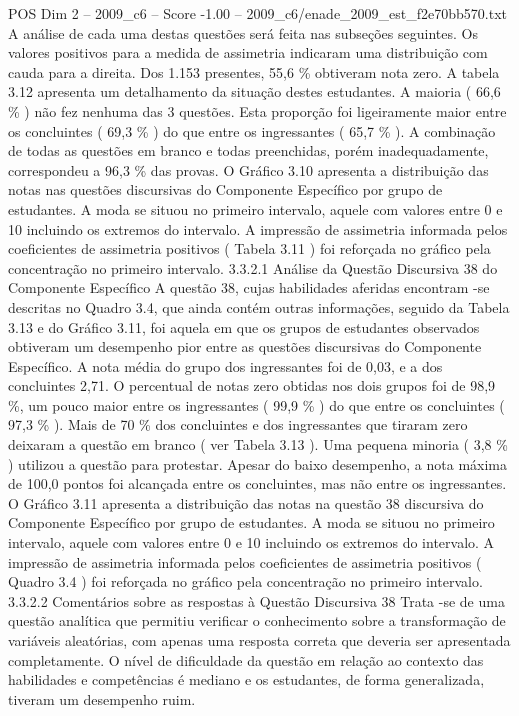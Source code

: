 \begin{textsample}{POS Dim 2 – 2009\_c6 – Score -1.00 – 2009\_c6/enade\_2009\_est\_f2e70bb570.txt}
A análise de cada uma destas questões será feita nas subseções seguintes.
Os valores positivos para a medida de assimetria indicaram uma distribuição com cauda para a direita.
Dos 1.153 presentes, 55,6 \% obtiveram nota zero.
A tabela 3.12 apresenta um detalhamento da situação destes estudantes.
A maioria ( 66,6 \% ) não fez nenhuma das 3 questões.
Esta proporção foi ligeiramente maior entre os concluintes ( 69,3 \% ) do que entre os ingressantes ( 65,7 \% ).
A combinação de todas as questões em branco e todas preenchidas, porém inadequadamente, correspondeu a 96,3 \% das provas.
O Gráfico 3.10 apresenta a distribuição das notas nas questões discursivas do Componente Específico por grupo de estudantes.
A moda se situou no primeiro intervalo, aquele com valores entre 0 e 10 incluindo os extremos do intervalo.
A impressão de assimetria informada pelos coeficientes de assimetria positivos ( Tabela 3.11 ) foi reforçada no gráfico pela concentração no primeiro intervalo. 3.3.2.1 Análise da Questão Discursiva 38 do Componente Específico A questão 38, cujas habilidades aferidas encontram -se descritas no Quadro 3.4, que ainda contém outras informações, seguido da Tabela 3.13 e do Gráfico 3.11, foi aquela em que os grupos de estudantes observados obtiveram um desempenho pior entre as questões discursivas do Componente Específico.
A nota média do grupo dos ingressantes foi de 0,03, e a dos concluintes 2,71.
O percentual de notas zero obtidas nos dois grupos foi de 98,9 \%, um pouco maior entre os ingressantes ( 99,9 \% ) do que entre os concluintes ( 97,3 \% ).
Mais de 70 \% dos concluintes e dos ingressantes que tiraram zero deixaram a questão em branco ( ver Tabela 3.13 ).
Uma pequena minoria ( 3,8 \% ) utilizou a questão para protestar.
Apesar do baixo desempenho, a nota máxima de 100,0 pontos foi alcançada entre os concluintes, mas não entre os ingressantes.
O Gráfico 3.11 apresenta a distribuição das notas na questão 38 discursiva do Componente Específico por grupo de estudantes.
A moda se situou no primeiro intervalo, aquele com valores entre 0 e 10 incluindo os extremos do intervalo.
A impressão de assimetria informada pelos coeficientes de assimetria positivos ( Quadro 3.4 ) foi reforçada no gráfico pela concentração no primeiro intervalo. 3.3.2.2 Comentários sobre as respostas à Questão Discursiva 38 Trata -se de uma questão analítica que permitiu verificar o conhecimento sobre a transformação de variáveis aleatórias, com apenas uma resposta correta que deveria ser apresentada completamente.
O nível de dificuldade da questão em relação ao contexto das habilidades e competências é mediano e os estudantes, de forma generalizada, tiveram um desempenho ruim.

\end{textsample}
